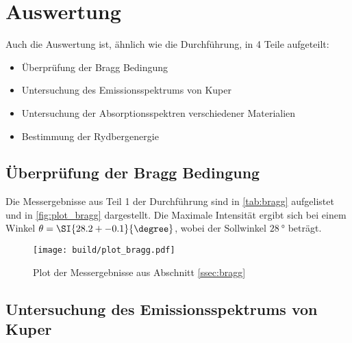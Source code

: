 \newpage
\section{Auswertung}
\label{sec:Auswertung}



Auch die Auswertung ist, ähnlich wie die Durchführung, in 4 Teile aufgeteilt:
\begin{itemize}
    \item Überprüfung der Bragg Bedingung
    \item Untersuchung des Emissionsspektrums von Kuper
    \item Untersuchung der Absorptionsspektren verschiedener Materialien
    \item Bestimmung der Rydbergenergie
\end{itemize}



\subsection{Überprüfung der Bragg Bedingung}
\label{ssec:bragg_auswertung}

Die Messergebnisse aus Teil 1 der Durchführung sind in \autoref{tab:bragg} aufgelistet und in \autoref{fig:plot_bragg} dargestellt.
Die Maximale Intensität ergibt sich bei einem Winkel $\theta=\SI{28.2+-0.1}{\degree}$, wobei der Sollwinkel $\SI{28}{\degree}$ beträgt.

\begin{figure}
    \centering
    \texttt{[image: build/plot\_bragg.pdf]}
    \caption{Plot der Messergebnisse aus Abschnitt \ref{ssec:bragg}}
    \label{fig:plot_bragg}
\end{figure}



\subsection{Untersuchung des Emissionsspektrums von Kuper}
\label{ssec:emission_auswertung}

